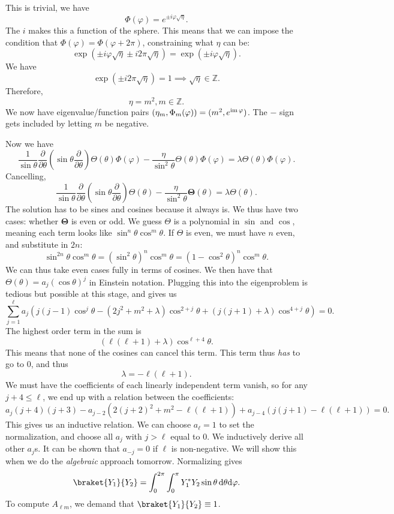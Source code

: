 This is trivial, we have
\[
	\Phi (\varphi )=e^{\pm i\varphi \sqrt{\eta }} 
.\]
The $i$ makes this a function of the sphere. This means that we can impose the condition that $\Phi (\varphi )=\Phi (\varphi +2\pi )$, constraining what $\eta $ can be:
\[
	\exp \left( \pm i\varphi\sqrt{\eta }  \pm i2\pi  \sqrt{\eta } \right) =\exp \left(\pm i\varphi \sqrt{\eta }  \right) 
.\]
We have
\[
	\exp \left(\pm i2\pi \sqrt{\eta }  \right) =1 \implies \sqrt{\eta } \in \mathbb{Z} 
.\]
Therefore,
\[
	\eta =m^2,m\in\mathbb{Z} 
.\]
We now have eigenvalue/function pairs $(\eta_m,\Phi_m (\varphi ))=(m^2,e^{\operatorname{im}  \varphi} )$. The $-$ sign gets included by letting $m$ be negative.

Now we have
\[
	\frac{1}{\sin \theta } \frac{\partial }{\partial \theta } \left( \sin \theta \frac{\partial }{\partial \theta }  \right) \Theta (\theta )\Phi (\varphi )-\frac{\eta }{\sin ^2\theta } \Theta (\theta )\Phi (\varphi )=\lambda \Theta (\theta )\Phi (\varphi )
.\]
Cancelling,
\[
	\frac{1}{\sin \theta } \frac{\partial }{\partial \theta } \left( \sin \theta \frac{\partial }{\partial \theta }  \right) \Theta (\theta )-\frac{\eta }{\sin ^2\theta } \boldsymbol{\Theta} (\theta )=\lambda \Theta (\theta )
.\]
The solution has to be sines and cosines because it always is. We thus have two cases: whether $\boldsymbol{\Theta} $ is even or odd. We guess $\Theta $ is a polynomial in $\sin $ and $\cos $, meaning each term looks like $\sin ^n\theta \cos ^m\theta $. If $\Theta $ is even, we must have $n$ even, and substitute in $2n$:
\[
	\sin ^{2n} \theta \cos ^m\theta =\left( \sin ^2\theta  \right)^n \cos ^m\theta =\left( 1-\cos ^2\theta  \right)^n \cos ^m\theta 
.\]
We can thus take even cases fully in terms of cosines. We then have that $\Theta (\theta )=a_j(\cos \theta )^j$ in Einstein notation. Plugging this into the eigenproblem is tedious but possible at this stage, and gives us
\[
	\sum_{j=1}^{\ell } a_j\left( j(j-1)\cos ^j\theta -(2j^2+m^2+\lambda )\cos^{2+j} \theta +(j(j+1)+\lambda)\cos ^{4+j} \theta   \right) =0
.\]
The highest order term in the sum is
\[
	(\ell (\ell +1)+\lambda )\cos ^{\ell +4} \theta 
.\]
This means that none of the cosines can cancel this term. This term thus \emph{has} to go to 0, and thus
\[
	\lambda =-\ell (\ell +1)
.\]
We must have the coefficients of each linearly independent term vanish, so for any $j+4\leq \ell $, we end up with a relation between the coefficients:
\[
	a_{j} (j+4)(j+3)-a_{j-2}(2(j+2)^2+m^2-\ell (\ell +1))+a_{j-4}(j(j+1)-\ell (\ell +1))=0
.\]
This gives us an inductive relation. We can choose $a_\ell =1$ to set the normalization, and choose all $a_{j} $ with $j>\ell $ equal to 0. We inductively derive all other $a_j$s. It can be shown that $a_{-j} =0$ if $\ell $ is non-negative. We will show this when we do the \emph{algebraic} approach tomorrow. Normalizing gives
\[
	\braket{Y_1}{Y_2} =\int_{0}^{2\pi }\int_{0}^{\pi } Y_1^*Y_2 \sin \theta  \,\mathrm{d} \theta  \mathrm{d} \varphi 
.\]
To compute $A_{\ell m} $, we demand that $\braket{Y_1}{Y_2} \equiv 1$.
